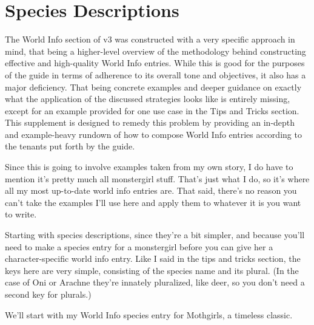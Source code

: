 \documentclass[Source-main.tex]{subfiles}
\begin{document}
\appendix
\chapter{Species Descriptions}
\label{appendix:species}

The World Info section of v3 was constructed with a very specific approach in mind, that being a higher-level overview of the methodology behind constructing effective and high-quality World Info entries.
While this is good for the purposes of the guide in terms of adherence to its overall tone and objectives, it also has a major deficiency.
That being concrete examples and deeper guidance on exactly what the application of the discussed strategies looks like is entirely missing, except for an example provided for one use case in the Tips and Tricks section.
This supplement is designed to remedy this problem by providing an in-depth and example-heavy rundown of how to compose World Info entries according to the tenants put forth by the guide.

Since this is going to involve examples taken from my own story, I do have to mention it’s pretty much all monstergirl stuff.
That’s just what I do, so it’s where all my most up-to-date world info entries are.
That said, there’s no reason you can’t take the examples I’ll use here and apply them to whatever it is you want to write.


Starting with species descriptions, since they’re a bit simpler, and because you’ll need to make a species entry for a monstergirl before you can give her a character-specific world info entry.
Like I said in the tips and tricks section, the keys here are very simple, consisting of the species name and its plural.
(In the case of Oni or Arachne they’re innately pluralized, like deer, so you don’t need a second key for plurals.)


We’ll start with my World Info species entry for Mothgirls, a timeless classic.
\end{document}
